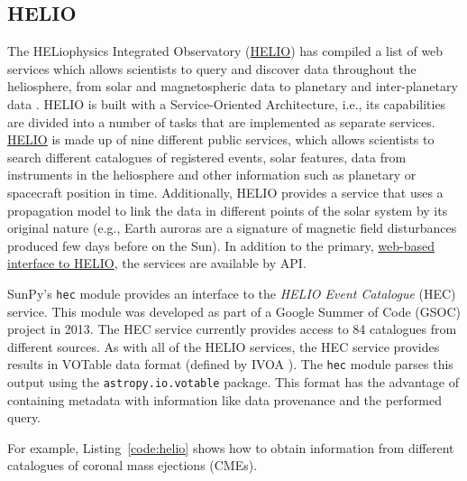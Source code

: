 \subsection{HELIO}\label{ssec:helio}

The HELiophysics Integrated Observatory (\href{http://helio-vo.eu}{HELIO}) has 
compiled a list of web services which allows scientists to query and 
discover data throughout the heliosphere, from solar and magnetospheric data to planetary and 
inter-planetary data \citep{dps2012}.
HELIO is built with a Service-Oriented Architecture, 
i.e., its capabilities are divided into a number of tasks that are 
implemented as separate services. 
\href{http://helio-vo.eu}{HELIO} is made up of nine different public services, 
which allows scientists to search different catalogues of registered events, 
solar features, data from instruments in the heliosphere and other information 
such as planetary or spacecraft position in time. 
Additionally, HELIO provides a service that uses a 
propagation model to link the data in different points of the solar system by 
its original nature (e.g., Earth auroras are a signature of magnetic 
field disturbances produced few days before on the Sun).
In addition to the primary, \href{http://hfe.helio-vo.eu}{web-based interface to 
HELIO}, the services are available by API.

SunPy's \texttt{hec} module provides an interface to the
\textit{HELIO Event Catalogue} (HEC) service. This module was developed as
part of a Google Summer of Code (GSOC) project in 2013.
The HEC service currently provides access to 84 catalogues from different
sources.
As with all of the HELIO services, the HEC service provides results in VOTable 
data format (defined by IVOA \citep{ochsenbein_ivoa_2011}).
The \texttt{hec}
module parses this output using the \texttt{astropy.io.votable} package.
This format has the advantage of containing metadata with information like
data provenance and the performed query.

For example, Listing~\ref{code:helio} shows how to obtain information
from different catalogues of coronal mass ejections (CMEs).

